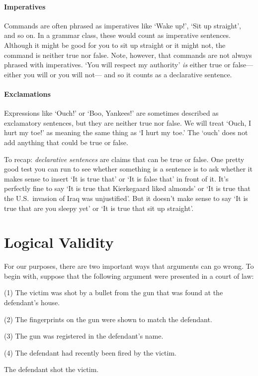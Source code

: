\paragraph{Imperatives} Commands are often phrased as imperatives like `Wake up!', `Sit up straight', and so on.
In a grammar class, these would count as imperative sentences.
Although it might be good for you to sit up straight or it might not, the command is neither true nor false.
Note, however, that commands are not always phrased with imperatives.
`You will respect my authority' \emph{is} either true or false--- either you will or you will not--- and so it counts as a declarative sentence.

\paragraph{Exclamations} Expressions like `Ouch!' or `Boo, Yankees!' are sometimes described as exclamatory sentences, but they are neither true nor false.
We will treat `Ouch, I hurt my toe!' as meaning the same thing as `I hurt my toe.'
The `ouch' does not add anything that could be true or false.

To recap: \emph{declarative sentences} are claims that can be true or false.
One pretty good test you can run to see whether something is a sentence is to ask whether it makes sense to insert `It is true that' or `It is false that' in front of it.
It's perfectly fine to say `It is true that Kierkegaard liked almonds' or `It is true that the U.S.\ invasion of Iraq was unjustified'.
But it doesn't make sense to say `It is true that are you sleepy yet' or `It is true that sit up straight'.





\section{Logical Validity}
  \label{sec:validity}

For our purposes, there are two important ways that arguments can go wrong.
To begin with, suppose that the following argument were presented in a court of law:

\begin{earg}
  \item[(1)] The victim was shot by a bullet from the gun that was found at the defendant's house.
  \item[(2)] The fingerprints on the gun were shown to match the defendant.
  \item[(3)] The gun was registered in the defendant's name.
  \item[(4)] The defendant had recently been fired by the victim.
  \item[\therefore] The defendant shot the victim.
\end{earg}

